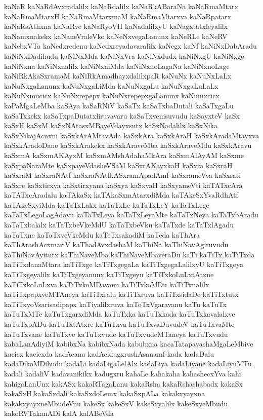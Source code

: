 {kaNaR
kaNaRdAvxradalilx
kaNaRdalilx
kaNaRkABaraNa
kaNaRmaMtarx
kaNaRmaMtarxH
kaNaRmaMtarxmaM
kaNaRmaMtarxva
kaNaRpatarx
kaNaRsAthxna
kaNaRve
kaNaRyoVH
kaNadalilxyU
kaNagxtatxleyalilx
kaNamxnakekx
kaNaneVraleVko
kaNeNxvegaLanunx
kaNeRLe
kaNeRV
kaNebxVTa
kaNedxredenu
kaNedxreyadavaralilx
kaNegx
kaNf
kaNiNxDabAradu
kaNiNxDadihudu
kaNiNxMda
kaNiNxVra
kaNiNxdudx
kaNiNxgU
kaNiNxge
kaNiNxna
kaNiNxnalilx
kaNiNxniMda
kaNiNxnoLagaNa
kaNiNxnoLage
kaNiRkAkaSxramaM
kaNiRkAmadhayxdalilxpaR
kaNuNx
kaNuNxLaLx
kaNuNxgaLanunx
kaNuNxgaLiMda
kaNuNxgaLu
kaNuNxgaLuLaLx
kaNuNxmucicx
kaNuNxrepepx
kaNuNxrepepxgaLanunx
kaNumxcicx
kaPaMgaLeMba
kaSAya
kaSaRNiV
kaSaTx
kaSaTxbaDutali
kaSaTxgaLu
kaSaTxkekx
kaSaTxpaDutatxliruvavaru
kaSaTxvenisuvudu
kaSayxteV
kaSx
kaSxH
kaSxM
kaSxNAtasxMBayeVdayxsutx
kaSxNadalilx
kaSxNika
kaSxNikajAcnxni
kaSxkArAMtavAda
kaSxkAra
kaSxkAraH
kaSxkAradaMtayxva
kaSxkAradoDane
kaSxkArakekx
kaSxkAraveMba
kaSxkAraveMdu
kaSxkAravu
kaSxmA
kaSxmAKAyxM
kaSxmAMshAdahaMkAra
kaSxmAlAyAM
kaSxme
kaSxpaNaraMte
kaSxpayeVdasheVSaM
kaSxrAKayxkaH
kaSxra
kaSxraH
kaSxraM
kaSxraNAtf
kaSxraNAtfkASxramApadAmf
kaSxrameVva
kaSxrati
kaSxre
kaSxtirxya
kaSxtirxyana
kaSxya
kaSxyaH
kaSxyameVti
kaTATxcAra
kaTATxcAradalu
kaTAkaSx
kaTAkaSxmAtarxdiMda
kaTAkeSxYvaRdhAtf
kaTAkeSxyiMda
kaTaTxLakx
kaTaTxLe
kaTaTxLeY
kaTaTxLege
kaTaTxLegoLagAdavu
kaTaTxLeya
kaTaTxLeyaMte
kaTaTxNeya
kaTaTxbAradu
kaTaTxbalalx
kaTaTxbeVkeMdU
kaTaTxbeVku
kaTaTxde
kaTaTxlAgadu
kaTaTxne
kaTaTxveVkeMdu
kaTeTxsakadiM
kaTeda
kaThAra
kaThArashAcxmariV
kaThadAvxdashaM
kaThiNa
kaThiNavAgiruvudu
kaThiNavAyitutx
kaThiNaveMba
kaThiNaveMbaveraDu
kaTi
kaTiTx
kaTiTxda
kaTiTxdanaMtara
kaTiTxge
kaTiTxgegaLa
kaTiTxgegaLalilxyU
kaTiTxgeya
kaTiTxgeyalilx
kaTiTxgeyanunx
kaTiTxgeyu
kaTiTxkoLuLxtAtxne
kaTiTxkoLuLxva
kaTiTxkoMDavanu
kaTiTxkoMDu
kaTiTxnalilx
kaTiTxpapxveMTAneya
kaTiTxralu
kaTiTxruva
kaTiTxsidaDe
kaTiTxtutx
kaTiTxyoVsarisadipapx
kaTiyalilxruva
kaToTxVgaravanu
kaTu
kaTuTx
kaTuTxMTe
kaTuTxgarxdiMda
kaTuTxka
kaTuTxkada
kaTuTxkavalalxve
kaTuTxpADu
kaTuTxtAtxre
kaTuTxva
kaTuTxvaDuvudeV
kaTuTxvaMte
kaTuTxvane
kaTuTxve
kaTuTxvude
kaTuTxvudeMTaneya
kaTuTxvudu
kabaLanAdiyiM
kabibxNa
kabibxNada
kabubxna
kacaTatapayashaMgaLeMbive
kacicx
kacicxda
kadAcana
kadAcidugxrushAsanamf
kada
kadaDalu
kadaDikoMDihudu
kadaLi
kadaLigaLelAlx
kadaLiya
kadaLiyane
kadaLiyuMTu
kadali
kadaliV
kadavanikikx
kadugxru
kahaLe
kahakaha
kahashecxYva
kahi
kahigaLanUnx
kakASx
kakaRTagaLanu
kakaRsha
kakaRshashabadx
kakaSx
kakaSxH
kakaSxdali
kakaSxdoLemx
kakaSxpALa
kakakxyayxna
kakakxyayxneMbudeVnu
kakeSx
kakeSxV
kakeSxyalilx
kakeSxyeMbudu
kakoRVTakanADi
kalA
kalABeVda
}
